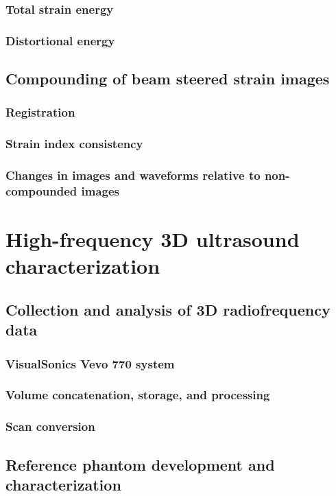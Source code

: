 \documentclass[12pt,twoside]{withesis}
\begin{document}
\subsection{Total strain energy}
\subsection{Distortional energy}

\section{Compounding of beam steered strain images}
\subsection{Registration}
\subsection{Strain index consistency}
\subsection{Changes in images and waveforms relative to non-compounded images}


\chapter{High-frequency 3D ultrasound characterization}

\section{Collection and analysis of 3D radiofrequency data}
\subsection{VisualSonics Vevo 770 system}
\subsection{Volume concatenation, storage, and processing}
\subsection{Scan conversion}

\section{Reference phantom development and characterization}
\end{document}
